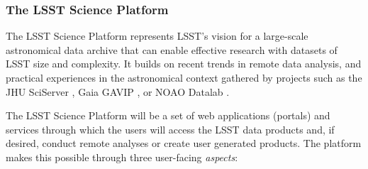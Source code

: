 \subsubsection{The LSST Science Platform}
\label{sec:lsp}

The LSST Science Platform \citep{LSE-319} represents LSST's vision for a
large-scale astronomical data archive that can enable effective research
with datasets of LSST size and complexity.  It builds on recent trends in
remote data analysis, and practical experiences in the astronomical context
gathered by projects such as the JHU
SciServer \citep{2017AAS...22923615R}, Gaia GAVIP \citep{2016SPIE.9913E..1VV}, or NOAO Datalab \citep{2016SPIE.9913E..0LF}.

The LSST Science Platform will be a set of web applications (portals) and
services through which the users will access the LSST data products and, if
desired, conduct remote analyses or create user generated products.  The
platform makes this possible through three user-facing \emph{aspects}:
%
